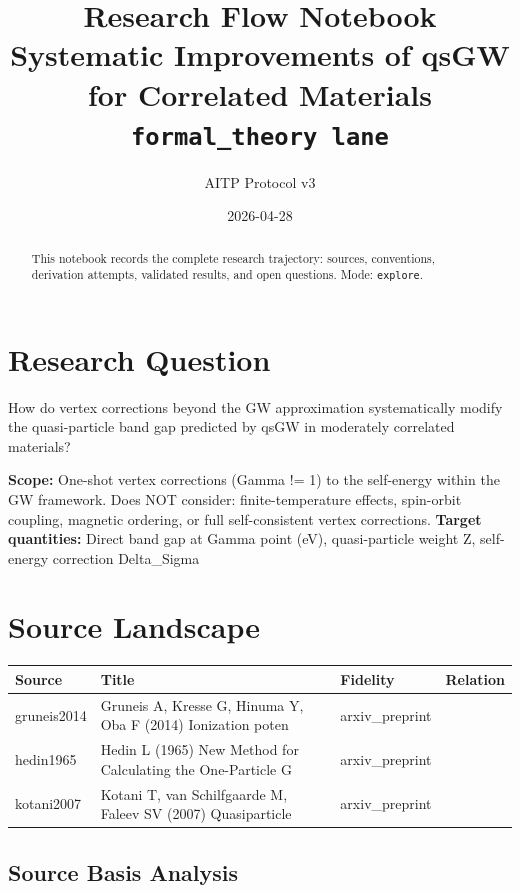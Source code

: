 \documentclass[11pt,a4paper]{article}
\title{\textbf{Research Flow Notebook}\\[0.4em]
  \large Systematic Improvements of qsGW for Correlated Materials
  \quad \texttt{formal\_theory lane}
}
\author{AITP Protocol v3}
\date{2026-04-28}
\begin{document}
\maketitle
\begin{abstract}
This notebook records the complete research trajectory: sources, conventions,
derivation attempts, validated results, and open questions.
Mode: \texttt{explore}.
\end{abstract}

\tableofcontents
\newpage
\section{Research Question}

\begin{resultbox}
How do vertex corrections beyond the GW approximation systematically modify the quasi-particle band gap predicted by qsGW in moderately correlated materials?
\end{resultbox}

\noindent
\textbf{Scope:} One-shot vertex corrections (Gamma != 1) to the self-energy within the GW framework. Does NOT consider: finite-temperature effects, spin-orbit coupling, magnetic ordering, or full self-consistent vertex corrections. \quad
\textbf{Target quantities:} Direct band gap at Gamma point (eV), quasi-particle weight Z, self-energy correction Delta\_Sigma

\section{Source Landscape}

\begin{longtable}{>{\raggedright}p{3cm} p{5cm} p{2.5cm} p{2.5cm}}
\toprule
\textbf{Source} & \textbf{Title} & \textbf{Fidelity} & \textbf{Relation} \\
\midrule
\endhead
gruneis2014 & Gruneis A, Kresse G, Hinuma Y, Oba F (2014) Ionization poten & arxiv\_preprint &  \\
hedin1965 & Hedin L (1965) New Method for Calculating the One-Particle G & arxiv\_preprint &  \\
kotani2007 & Kotani T, van Schilfgaarde M, Faleev SV (2007) Quasiparticle & arxiv\_preprint &  \\
\bottomrule
\end{longtable}

\subsection*{Source Basis Analysis}
\end{document}

